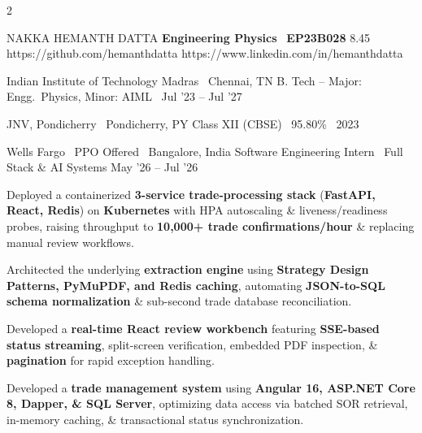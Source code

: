 \documentclass{resume}
\begin{document}
\linespread{1}\selectfont

\noindent
\begin{paracol}{2}


\resumeHeading
{NAKKA HEMANTH DATTA \href{https://frontend-virid-eight-30.vercel.app/}{\raisebox{0.1ex}{\scalebox{1.1}{\cmd}}}}
{\textbf{Engineering Physics} \textbar\ \textbf{EP23B028}}
{8.45}
{https://github.com/hemanthdatta}
{https://www.linkedin.com/in/hemanthdatta}
{}


\resumeEducation
{Indian Institute of Technology Madras}
{\faMapMarker*\ Chennai, TN}
{B. Tech -- Major: Engg.\ Physics, Minor: AIML}
{\faCalendar*\ Jul '23 -- Jul '27}

\resumeEducation
{JNV, Pondicherry}
{\faMapMarker*\ Pondicherry, PY}
{Class XII (CBSE) \textbar\ 95.80\%}
{\faCalendar*\ 2023}


\resumeExperience
{Wells Fargo \textbar\ PPO Offered \hfill {\normalfont\small\faMapMarker*\ Bangalore, India}}
{\textcolor{subheadingblue}{Software Engineering Intern \textbar\ Full Stack \& AI Systems}}
{May '26 -- Jul '26}
{
\begin{resumeItemize}
\item Deployed a containerized \textbf{3-service trade-processing stack} (\textbf{FastAPI, React, Redis}) on \textbf{Kubernetes} with HPA autoscaling \& liveness/readiness probes, raising throughput to \textbf{10,000+ trade confirmations/hour} \& replacing manual review workflows.

\item Architected the underlying \textbf{extraction engine} using \textbf{Strategy Design Patterns, PyMuPDF, and Redis caching}, automating \textbf{JSON-to-SQL schema normalization} \& sub-second trade database reconciliation.

\item Developed a \textbf{real-time React review workbench} featuring \textbf{SSE-based status streaming}, split-screen verification, embedded PDF inspection, \& \textbf{pagination} for rapid exception handling.

\item Developed a \textbf{trade management system} using \textbf{Angular 16, ASP.NET Core 8, Dapper, \& SQL Server}, optimizing data access via batched SOR retrieval, in-memory caching, \& transactional status synchronization.


\end{resumeItemize}}
\end{paracol}
\end{document}
